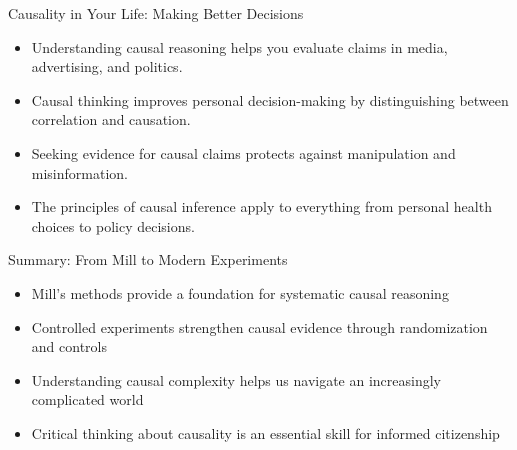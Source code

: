 \documentclass{beamer}
\begin{document}
\begin{frame}{Causality in Your Life: Making Better Decisions}
    \begin{itemize}
        \item Understanding causal reasoning helps you evaluate claims in media, advertising, and politics.
        \item Causal thinking improves personal decision-making by distinguishing between correlation and causation.
        \item Seeking evidence for causal claims protects against manipulation and misinformation.
        \item The principles of causal inference apply to everything from personal health choices to policy decisions.
    \end{itemize}
    
    \begin{block}{Summary: From Mill to Modern Experiments}
        \scriptsize
        \begin{itemize}
            \item Mill's methods provide a foundation for systematic causal reasoning
            \item Controlled experiments strengthen causal evidence through randomization and controls
            \item Understanding causal complexity helps us navigate an increasingly complicated world
            \item Critical thinking about causality is an essential skill for informed citizenship
        \end{itemize}
    \end{block}
\end{frame}

\end{document}
